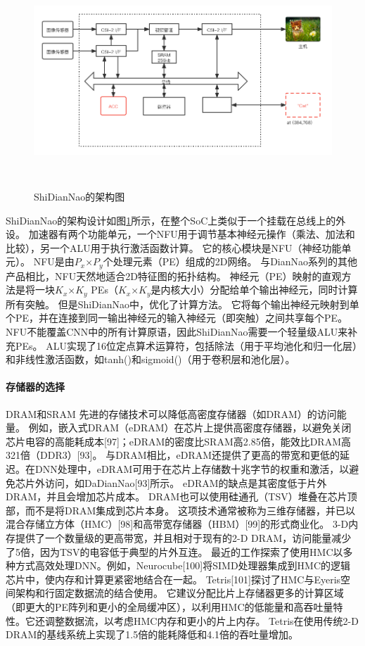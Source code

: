 \begin{figure}[htbp]
    \centering
    \includegraphics[width=15cm,height=8cm]{figures/ShiDianNao_arch.png}
    \caption{ShiDianNao的架构图}
    \label{fig:shidiannao_arch}
\end{figure}
ShiDianNao的架构设计如图\ref{fig:shidiannao_arch}所示，在整个SoC上类似于一个挂载在总线上的外设。
加速器有两个功能单元，一个NFU用于调节基本神经元操作（乘法、加法和比较），另一个ALU用于执行激活函数计算。
它的核心模块是NFU（神经功能单元）。
NFU是由$P_x$×$P_y$个处理元素（PE）组成的2D网络。
与DianNao系列的其他产品相比，NFU天然地适合2D特征图的拓扑结构。  
神经元（PE）映射的直观方法是将一块$K_x$×$K_y$ PEs（$K_x$×$K_y$是内核大小）分配给单个输出神经元，同时计算所有突触。
但是ShiDianNao中，优化了计算方法。
它将每个输出神经元映射到单个PE，并在连接到同一输出神经元的输入神经元（即突触）之间共享每个PE。  
NFU不能覆盖CNN中的所有计算原语，因此ShiDianNao需要一个轻量级ALU来补充PEs。
ALU实现了16位定点算术运算符，包括除法（用于平均池化和归一化层）和非线性激活函数，如tanh()和sigmoid()（用于卷积层和池化层）。


\paragraph{存储器的选择}
DRAM和SRAM
先进的存储技术可以降低高密度存储器（如DRAM）的访问能量。
例如，嵌入式DRAM（eDRAM）在芯片上提供高密度存储器，以避免关闭芯片电容的高能耗成本[97]；eDRAM的密度比SRAM高2.85倍，能效比DRAM高321倍（DDR3）[93]。
与DRAM相比，eDRAM还提供了更高的带宽和更低的延迟。在DNN处理中，eDRAM可用于在芯片上存储数十兆字节的权重和激活，以避免芯片外访问，如DaDianNao[93]所示。
eDRAM的缺点是其密度低于片外DRAM，并且会增加芯片成本。
DRAM也可以使用硅通孔（TSV）堆叠在芯片顶部，而不是将DRAM集成到芯片本身。
这项技术通常被称为三维存储器，并已以混合存储立方体（HMC）[98]和高带宽存储器（HBM）[99]的形式商业化。
3-D内存提供了一个数量级的更高带宽，并且相对于现有的2-D DRAM，访问能量减少了5倍，因为TSV的电容低于典型的片外互连。
最近的工作探索了使用HMC以多种方式高效处理DNN。例如，Neurocube[100]将SIMD处理器集成到HMC的逻辑芯片中，使内存和计算更紧密地结合在一起。
Tetris[101]探讨了HMC与Eyeris空间架构和行固定数据流的结合使用。
它建议分配比片上存储器更多的计算区域（即更大的PE阵列和更小的全局缓冲区），以利用HMC的低能量和高吞吐量特性。它还调整数据流，以考虑HMC内存和更小的片上内存。
Tetris在使用传统2-D DRAM的基线系统上实现了1.5倍的能耗降低和4.1倍的吞吐量增加。


